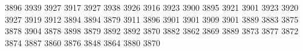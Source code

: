 3896
3939
3927
3917
3927
3938
3926
3916
3923
3900
3895
3921
3901
3923
3920
3927
3919
3912
3894
3894
3879
3911
3896
3901
3901
3909
3901
3889
3883
3875
3878
3904
3878
3898
3879
3892
3892
3870
3882
3862
3869
3889
3873
3877
3872
3874
3887
3860
3876
3848
3864
3880
3870
